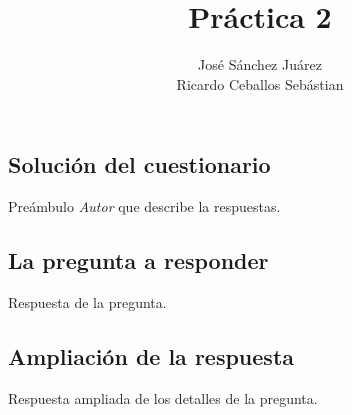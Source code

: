 \documentclass[12pt]{book}
\begin{document}

\begin{book}

\author{José Sánchez Juárez \\ Ricardo Ceballos Sebástian}
\title{Práctica 2}

\frontmatter
\maketitle
\tableofcontents

\mainmatter

\chapter[Cuestionario]{Solución del cuestionario}

Preámbulo \emph{Autor} que describe la respuestas.

\section[Título de la pregunta]{La pregunta a responder}

Respuesta de la pregunta.

\section[Ampliación de la respuesta]{Ampliación de la respuesta}

Respuesta ampliada de los detalles de la pregunta.

\end{book}
\end{document}

